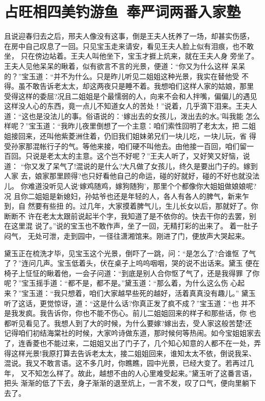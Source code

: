 \chapter{占旺相四美钓游鱼~奉严词两番入家塾}

且说迎春归去之后，邢夫人像没有这事，倒是王夫人抚养了一场，却甚实伤感，
在房中自己叹息了一回。只见宝玉走来请安，看见王夫人脸上似有泪痕，也不敢坐，
只在傍边站着。王夫人叫他坐下，宝玉才捱上炕来，就在王夫人身
旁坐了。王夫人见他呆呆的瞅着，似有欲言不言的光景，便道：“你又为什么这样
呆呆的？”宝玉道：“并不为什么。只是昨儿听见二姐姐这种光景，我实在替他受
不得。虽不敢告诉老太太，却这两夜只是睡不着。我想咱们这样人家的姑娘，那里
受得这样的委屈?况且二姐姐是个最懦弱的人，向来不会和人拌嘴，偏偏儿的遇见
这样没人心的东西，竟一点儿不知道女人的苦处！”说着，几乎滴下泪来。王夫人
道：“这也是没法儿的事。俗语说的：‘嫁出去的女孩儿，泼出去的水。’叫我能
怎么样呢？”宝玉道：“我昨儿夜里倒想了一个主意：咱们索性回明了老太太，把
二姐姐接回来，还叫他紫菱洲住着，仍旧我们姐妹弟兄们一块儿吃，一块儿玩，省
得受孙家那混帐行子的气。等他来接，咱们硬不叫他去。由他接一百回，咱们留一
百回。只说是老太太的主意。这个岂不好呢？”王夫人听了，又好笑又好恼，说道：
“你又发了呆气了!混说的是什么?大凡做了女孩儿，终久是要出门子的。嫁到人家
去，娘家那里顾得?也只好看他自己的命运，碰的好就好，碰的不好也就没法儿。
你难道没听见人说‘嫁鸡随鸡，嫁狗随狗’，那里个个都像你大姐姐做娘娘呢?况
且你二姐姐是新媳妇，孙姑爷也还是年轻的人，各人有各人的脾气，新来乍到，自
然要有些扭的。过几年，大家摸着脾气儿，生儿长女以后，那就好了。你断断不
许在老太太跟前说起半个字，我知道了是不依你的。快去干你的去罢，别在这里混
说了。”说的宝玉也不敢作声，坐了一回，无精打彩的出来了。着一肚子闷气，
无处可泄，走到园中，一径往潇湘馆来。刚进了门，便放声大哭起来。

黛玉正在梳洗才毕，见宝玉这个光景，倒吓了一跳，问：“是怎么了?合谁怄
了气了？”连问几声。宝玉低着头，伏在桌子上呜呜咽咽，哭的说不出话来。黛玉
便在椅子上怔怔的瞅着他，一会子问道：“到底是别人合你怄了气了，还是我得罪
了你呢？”宝玉摇手道：“都不是，都不是。”黛玉道：“那么着，为什么这么伤
心起来？”宝玉道：“我只想着，咱们大家越早些死的越好，活着真真没有趣儿。”
黛玉听了这话，更觉惊讶，道：“这是什么话?你真正发了疯不成？”宝玉道：“也
并不是我发疯。我告诉你，你也不能不伤心。前儿二姐姐回来的样子和那些话，你
也都听见看见了。我想人到了大的时候，为什么要嫁?嫁出去，受人家这般苦楚!还
记得咱们初结海棠社的时候，大家吟诗做东道，那时候何等热闹。如今宝姐姐家去
了，连香菱也不能过来，二姐姐又出了门子了，几个知心知意的人都不在一处，弄
得这样光景!我原打算去告诉老太太，接二姐姐回来，谁知太太不依，倒说我呆、
混说。我又不敢言语。这不多几时，你瞧瞧，园中光景，已经大变了。若再过几年，
又不知怎么样了。故此，越想不由的人心里难受起来。”黛玉听了这番言语，把头
渐渐的低了下去，身子渐渐的退至炕上，一言不发，叹了口气，便向里躺下去了。

